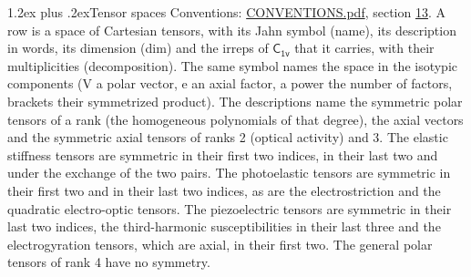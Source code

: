 \documentclass[10pt,a4paper]{article}
\makeatletter
\renewcommand\section{\@startsection{section}{1}{\z@}{-3ex plus -1ex minus -.2ex}%
  {1.2ex plus .2ex}{\normalfont\large\sffamily\bfseries\color{parttitle}}}
\numberwithin{equation}{section}
\newcommand{\grp}[1]{\mathsf{#1}}
\makeatother
\begin{document}
\section{Tensor spaces}\label{s:tensor_spaces}
Conventions: \href{../../CONVENTIONS.pdf}{CONVENTIONS.pdf}, section \href{../../CONVENTIONS.pdf\#conv.13}{13}.
\leavevmode\label{n:head.name}\label{n:head.description}\label{n:head.dim}\label{n:head.decomposition}A row is a space of Cartesian tensors, with its Jahn symbol (name), its description in words, its dimension (dim) and the irreps of $\grp{C_{1v}}$ that it carries, with their multiplicities (decomposition). \label{n:label.jahn}The same symbol names the space in the isotypic components (V a polar vector, e an axial factor, a power the number of factors, brackets their symmetrized product). The descriptions name the symmetric polar tensors of a rank (the homogeneous polynomials of that degree), the axial vectors and the symmetric axial tensors of ranks 2 (optical activity) and 3. The elastic stiffness tensors are symmetric in their first two indices, in their last two and under the exchange of the two pairs. The photoelastic tensors are symmetric in their first two and in their last two indices, as are the electrostriction and the quadratic electro-optic tensors. The piezoelectric tensors are symmetric in their last two indices, the third-harmonic susceptibilities in their last three and the electrogyration tensors, which are axial, in their first two. The general polar tensors of rank 4 have no symmetry.
\end{document}

